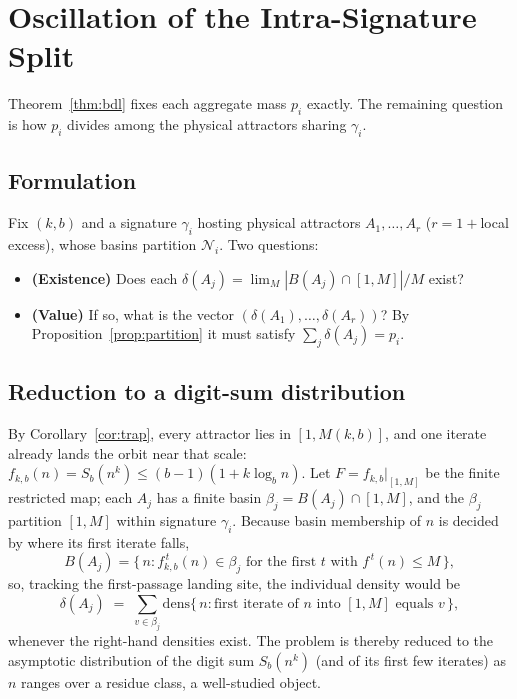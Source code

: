 \documentclass[11pt]{article}
\theoremstyle{definition}
\theoremstyle{remark}
\newcommand{\dens}{\mathrm{dens}}
\begin{document}
\section{Oscillation of the Intra-Signature Split}\label{sec:split}

Theorem~\ref{thm:bdl} fixes each aggregate mass $p_i$ exactly. The remaining question is how $p_i$ divides among the physical attractors sharing $\gamma_i$.

\subsection{Formulation}

Fix $(k,b)$ and a signature $\gamma_i$ hosting physical attractors $A_1,\dots,A_r$ ($r = 1 + {}$local excess), whose basins partition $\mathcal{N}_i$. Two questions:
\begin{itemize}
\item \textbf{(Existence)} Does each $\delta(A_j) = \lim_M |B(A_j) \cap [1,M]|/M$ exist?
\item \textbf{(Value)} If so, what is the vector $(\delta(A_1),\dots,\delta(A_r))$? By Proposition~\ref{prop:partition} it must satisfy $\sum_j \delta(A_j) = p_i$.
\end{itemize}

\subsection{Reduction to a digit-sum distribution}

By Corollary~\ref{cor:trap}, every attractor lies in $[1,M(k,b)]$, and one iterate already lands the orbit near that scale: $f_{k,b}(n) = S_b(n^k) \le (b-1)(1 + k \log_b n)$. Let $F = f_{k,b}\big|_{[1,M]}$ be the finite restricted map; each $A_j$ has a finite basin $\beta_j = B(A_j) \cap [1,M]$, and the $\beta_j$ partition $[1,M]$ within signature $\gamma_i$. Because basin membership of $n$ is decided by where its first iterate falls,
\[
B(A_j) = \{\, n : f_{k,b}^{\,t}(n) \in \beta_j \text{ for the first } t \text{ with } f^{\,t}(n) \le M \,\},
\]
so, tracking the first-passage landing site, the individual density would be
\[
\delta(A_j) \;=\; \sum_{v \in \beta_j} \dens\big\{\, n : \text{first iterate of } n \text{ into } [1,M] \text{ equals } v \,\big\},
\]
whenever the right-hand densities exist. The problem is thereby reduced to the asymptotic distribution of the digit sum $S_b(n^k)$ (and of its first few iterates) as $n$ ranges over a residue class, a well-studied object.
\end{document}
